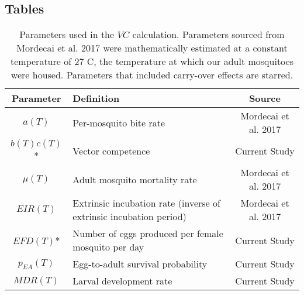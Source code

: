 \documentclass[doublespacing, linenumbers]{bmcart}
\begin{document}
\begin{backmatter}

\section*{Tables}

\begin{table}[h!]
\caption{Parameters used in the $VC$ calculation. Parameters sourced from Mordecai et al. 2017 \cite{mordecai2017} were mathematically estimated at a constant temperature of 27 \degree C, the temperature at which our adult mosquitoes were housed. Parameters that included carry-over effects are starred.}
      \begin{tabular}{clc}
        \hline
        \textbf{Parameter} 	& \textbf{Definition} 													& \textbf{Source}\\ \hline
        $a(T)$ 				& Per-mosquito bite rate 												& Mordecai et al. 2017 \\
		$b(T)c(T)$* 		& Vector competence 													& Current Study \\
		$\mu(T)$ 			& Adult mosquito mortality rate 										& Mordecai et al. 2017 \\
		$EIR(T)$ 			& Extrinsic incubation rate (inverse of extrinsic incubation period) 	& Mordecai et al. 2017 \\
		$EFD(T)$* 			& Number of eggs produced per female mosquito per day 					& Current Study \\
		$p_{EA}(T)$ 		& Egg-to-adult survival probability 									& Current Study \\
		$MDR(T)$ 			& Larval development rate 									& Current Study \\ \hline
      \end{tabular}
      \label{table:traits}
\end{table}


\begin{sidewaystable}[h!]


\end{sidewaystable}
\end{backmatter}
\end{document}
